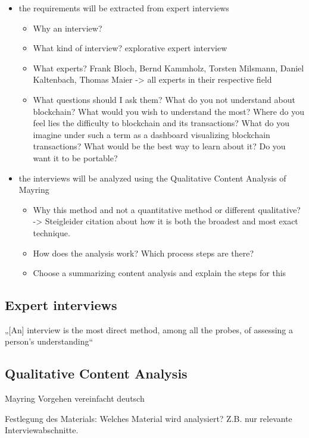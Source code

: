 \begin{itemize}
    \item the requirements will be extracted from expert interviews
    \begin{itemize}
        \item Why an interview?
        \item What kind of interview? explorative expert interview
        \item What experts? Frank Bloch, Bernd Kammholz, Torsten Milsmann, Daniel Kaltenbach, Thomas Maier -> all experts in their respective field
        \item What questions should I ask them? What do you not understand about blockchain? What would you wish to understand the most? Where do you feel lies the difficulty to blockchain and its transactions? What do you imagine under such a term as a dashboard visualizing blockchain transactions? What would be the best way to learn about it? Do you want it to be portable?
    \end{itemize}
    \item the interviews will be analyzed using the Qualitative Content Analysis of Mayring
    \begin{itemize}
        \item Why this method and not a quantitative method or different qualitative? -> Steigleider citation about how it is both the broadest and most exact technique. 
        \item How does the analysis work? Which process steps are there?
        \item Choose a summarizing content analysis and explain the steps for this
    \end{itemize}
\end{itemize}

\subsection{Expert interviews}

„[An] interview is the most direct method, among all the probes, of assessing a person’s understanding“ \cite{WhiteProbingunderstanding1992}

\subsection{Qualitative Content Analysis}

Mayring Vorgehen vereinfacht deutsch

Festlegung des Materials: Welches Material wird analysiert? Z.B. nur relevante Interviewabschnitte.


